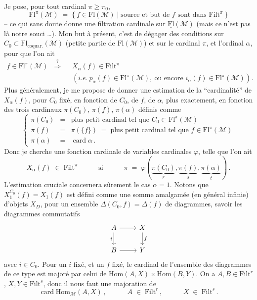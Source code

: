 \documentclass[11pt]{article}
\newcommand{\printedpage}[1]{\marginpar{\footnotesize p.~#1}}
\newcommand{\msp}[1]{\marginpar{\footnotesize [#1]}}
\newcommand{\Fl}{\mathrm{Fl}}
\newcommand{\uFl}{\underline{\mathrm{Fl}}}
\newcommand{\cM}{\mathcal{M}}
\newcommand{\Filt}{\mathrm{Filt}}
\newcommand{\card}{\operatorname{card}}
\begin{document}
Je pose, pour tout cardinal $\pi\geq\pi_0$,
\[
\Fl^\pi(\cM) \;=\; \{\ f\in\Fl(\cM) \mid \text{source et but de $f$ sont dans } \Filt^\pi\ \}
\tag*{(3.3)}
\]
-- ce qui sans doute donne une filtration cardinale sur $\uFl(\cM)$ (mais ce n'est pas là notre souci \ldots). Mon but à présent, c'est de dégager des conditions sur $C_0\subset\Fl_{\text{coquar.}}(\cM)$ (petite partie de $\Fl(\cM)$) et sur le cardinal $\pi$, et l'ordinal $\alpha$, pour que l'on ait
\[
\begin{aligned}
f\in\Fl^\pi(\cM) \;\;\overset{?}{\Longrightarrow}\;\; & X_\alpha(f)\in\Filt^\pi \\
& (\textit{i.e.}\ p_\alpha(f)\in\Fl^\pi(\cM),\ \text{ou encore } i_\alpha(f)\in\Fl^\pi(\cM))\,.
\end{aligned}
\tag*{(3.4)}
\]
Plus généralement, je me propose de donner une estimation de la ``cardinalité'' de $X_\alpha(f)$, pour $C_0$ fixé, en fonction de $C_0$, de $f$, de $\alpha$, plus exactement, en fonction des trois cardinaux $\pi(C_0)$, $\pi(f)$, $\pi(\alpha)$ définis comme
\[
\left\{
\begin{array}{rcl}
\pi(C_0) & = & \text{plus petit cardinal tel que } C_0\subset\Fl^\pi(\cM) \\[1ex]
\pi(f) & = & \pi(\{f\}) \;=\; \text{plus petit cardinal tel que } f\in\Fl^\pi(\cM) \\[1ex]
\pi(\alpha) & = & \card\alpha\,.
\end{array}
\right.
\tag*{(3.5)}
\]
Donc je cherche une fonction
\msp{page 18}
cardinale de variables cardinales $\varphi$, telle que l'on ait
\[
X_\alpha(f) \;\in\; \Filt^\pi \qquad\quad \text{si} \qquad\quad \pi \;=\; \varphi(\underbrace{\pi(C_0)}_{r},\underbrace{\pi(f)}_{s},\underbrace{\pi(\alpha)}_{t})\,.
\tag*{(3.6)}
\]
L'estimation cruciale concernera sûrement le cas $\alpha=1$. Notons que $X_1^{C_0}(f)=X_1(f)$ est défini comme une somme amalgamée (en général infinie) d'objets $X_D$, pour un ensemble $\Delta(C_0,f)=\Delta(f)$ de diagrammes, savoir les diagrammes commutatifs
\[
\begin{tikzcd}
A \arrow[r] \arrow[d, "i"'] & X \arrow[d, "f"] \\
B \arrow[r] & Y
\end{tikzcd}
\]
\printedpage{13}
avec $i\in C_0$. Pour un $i$ fixé, et un $f$ fixé, le cardinal de l'ensemble des diagrammes de ce type est majoré par celui de $\mathrm{Hom}(A,X)\times\mathrm{Hom}(B,Y)$. On a $A,B\in\Filt^r$, $X,Y\in\Filt^s$, donc il nous faut une majoration de
\[
\card\mathrm{Hom}_{\cM}(A,X)\,, \qquad\quad A\;\in\;\Filt^r\,, \qquad\quad X\;\in\;\Filt^s\,.
\]
\end{document}
